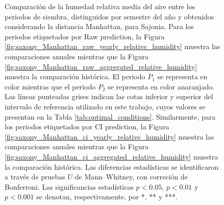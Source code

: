\begin{figure}[htbp]
	\caption{Comparación de la humedad relativa media del aire entre los periodos de siembra, distinguidos por semestre del año y obtenidos considerando la distancia Manhattan, para Sajonia. Para los periodos etiquetados por Raw prediction, la Figura \ref{fig:saxony_Manhattan_raw_yearly_relative_humidity} muestra las comparaciones anuales mientras que la Figura \ref{fig:saxony_Manhattan_raw_aggregated_relative_humidity} muestra la comparación histórica. El periodo $P_1$ se representa en color mientras que el periodo $P_2$ se representa en color anaranjado. Las líneas punteadas grises indican las cotas inferior y superior del intervalo de referencia utilizado en este trabajo, cuyos valores se presentan en la Tabla \ref{tab:optimal_conditions}. Similarmente, para los periodos etiquetados por CI prediction, la Figura \ref{fig:saxony_Manhattan_ci_yearly_relative_humidity} muestra las comparaciones anuales mientras que la Figura \ref{fig:saxony_Manhattan_ci_aggregated_relative_humidity} muestra la comparación histórica. Las diferencias estadísticas se identificaron a través de pruebas $U$ de Mann--Whitney, con correción de Bonferroni. Las significancias estadísticas $p<0.05$, $p<0.01$ y $p<0.001$ se denotan, respectivamente, por *, ** y ***.
	}
	\label{fig:saxony_Manhattan_relative_humidity}
	
	
\end{figure}





